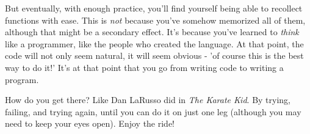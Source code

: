 \documentclass[12pt]{article}
\begin{document}
But eventually, with enough practice, you'll find yourself being able to recollect functions with ease. This is \textit{not} because you've somehow memorized all of them, although that might be a secondary effect. It's because you've learned to \textit{think} like a programmer, like the people who created the language. At that point, the code will not only seem natural, it will seem obvious - 'of course this is the best way to do it!' It's at that point that you go from writing code to writing a program. 

How do you get there? Like Dan LaRusso did in \textit{The Karate Kid}. By trying, failing, and trying again, until you can do it on just one leg (although you may need to keep your eyes open). Enjoy the ride!
\end{document}
